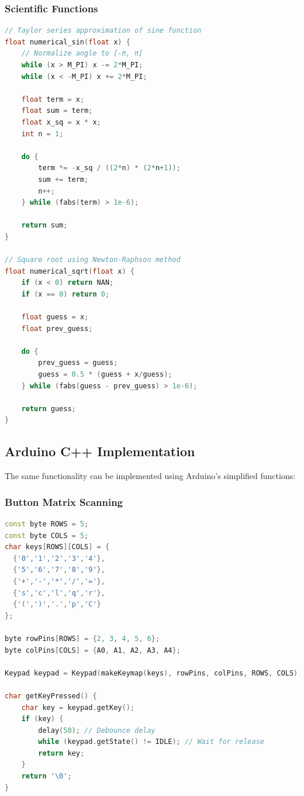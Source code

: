 \documentclass{article}
\begin{document}
\subsubsection{Scientific Functions}
\begin{lstlisting}[language=C]
// Taylor series approximation of sine function
float numerical_sin(float x) {
    // Normalize angle to [-π, π]
    while (x > M_PI) x -= 2*M_PI;
    while (x < -M_PI) x += 2*M_PI;
    
    float term = x;
    float sum = term;
    float x_sq = x * x;
    int n = 1;
    
    do {
        term *= -x_sq / ((2*n) * (2*n+1));
        sum += term;
        n++;
    } while (fabs(term) > 1e-6);
    
    return sum;
}

// Square root using Newton-Raphson method
float numerical_sqrt(float x) {
    if (x < 0) return NAN;
    if (x == 0) return 0;
    
    float guess = x;
    float prev_guess;
    
    do {
        prev_guess = guess;
        guess = 0.5 * (guess + x/guess);
    } while (fabs(guess - prev_guess) > 1e-6);
    
    return guess;
}
\end{lstlisting}

\subsection{Arduino C++ Implementation}
The same functionality can be implemented using Arduino's simplified functions:

\subsubsection{Button Matrix Scanning}
\begin{lstlisting}[language=C++]
const byte ROWS = 5;
const byte COLS = 5;
char keys[ROWS][COLS] = {
  {'0','1','2','3','4'},
  {'5','6','7','8','9'},
  {'+','-','*','/','='},
  {'s','c','l','q','r'},
  {'(',')','.','p','C'}
};

byte rowPins[ROWS] = {2, 3, 4, 5, 6};
byte colPins[COLS] = {A0, A1, A2, A3, A4};

Keypad keypad = Keypad(makeKeymap(keys), rowPins, colPins, ROWS, COLS);

char getKeyPressed() {
    char key = keypad.getKey();
    if (key) {
        delay(50); // Debounce delay
        while (keypad.getState() != IDLE); // Wait for release
        return key;
    }
    return '\0';
}
\end{lstlisting}
\end{document}
